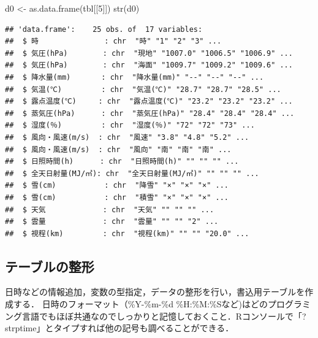 \documentclass[
]{article}
\newenvironment{Shaded}{\begin{snugshade}}{\end{snugshade}}
\newcommand{\DecValTok}[1]{\textcolor[rgb]{0.00,0.00,0.81}{#1}}
\newcommand{\FunctionTok}[1]{\textcolor[rgb]{0.00,0.00,0.00}{#1}}
\newcommand{\NormalTok}[1]{#1}
\newcommand{\OtherTok}[1]{\textcolor[rgb]{0.56,0.35,0.01}{#1}}
\begin{document}
\begin{Shaded}
\begin{Highlighting}[]
\NormalTok{d0 }\OtherTok{\textless{}{-}} \FunctionTok{as.data.frame}\NormalTok{(tbl[[}\DecValTok{5}\NormalTok{]])}
\FunctionTok{str}\NormalTok{(d0)}
\end{Highlighting}
\end{Shaded}

\begin{verbatim}
## 'data.frame':    25 obs. of  17 variables:
##  $ 時               : chr  "時" "1" "2" "3" ...
##  $ 気圧(hPa)        : chr  "現地" "1007.0" "1006.5" "1006.9" ...
##  $ 気圧(hPa)        : chr  "海面" "1009.7" "1009.2" "1009.6" ...
##  $ 降水量(mm)       : chr  "降水量(mm)" "--" "--" "--" ...
##  $ 気温(℃)         : chr  "気温(℃)" "28.7" "28.7" "28.5" ...
##  $ 露点温度(℃)     : chr  "露点温度(℃)" "23.2" "23.2" "23.2" ...
##  $ 蒸気圧(hPa)      : chr  "蒸気圧(hPa)" "28.4" "28.4" "28.4" ...
##  $ 湿度(％)         : chr  "湿度(％)" "72" "72" "73" ...
##  $ 風向・風速(m/s)  : chr  "風速" "3.8" "4.8" "5.2" ...
##  $ 風向・風速(m/s)  : chr  "風向" "南" "南" "南" ...
##  $ 日照時間(h)      : chr  "日照時間(h)" "" "" "" ...
##  $ 全天日射量(MJ/㎡): chr  "全天日射量(MJ/㎡)" "" "" "" ...
##  $ 雪(cm)           : chr  "降雪" "×" "×" "×" ...
##  $ 雪(cm)           : chr  "積雪" "×" "×" "×" ...
##  $ 天気             : chr  "天気" "" "" "" ...
##  $ 雲量             : chr  "雲量" "" "" "2" ...
##  $ 視程(km)         : chr  "視程(km)" "" "" "20.0" ...
\end{verbatim}

\hypertarget{ux30c6ux30fcux30d6ux30ebux306eux6574ux5f62}{%
\subsection{テーブルの整形}\label{ux30c6ux30fcux30d6ux30ebux306eux6574ux5f62}}

日時などの情報追加，変数の型指定，データの整形を行い，書込用テーブルを作成する．
日時のフォーマット（\%Y-\%m-\%d
\%H:\%M:\%Sなど)はどのプログラミング言語でもほぼ共通なのでしっかりと記憶しておくこと．Rコンソールで「?strptime」とタイプすれば他の記号も調べることができる．
\end{document}

